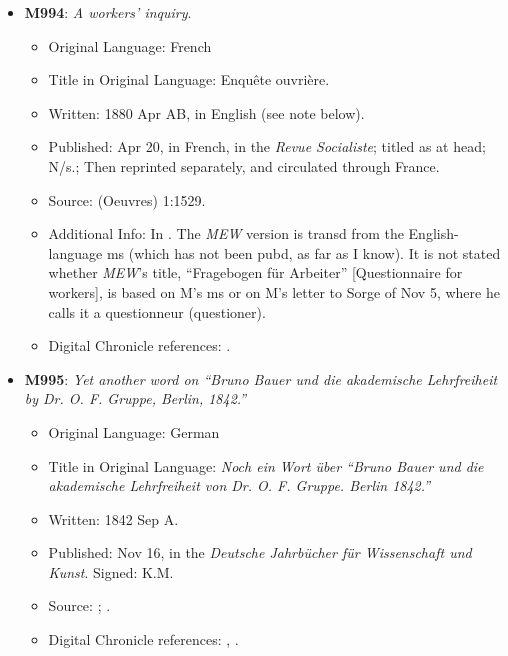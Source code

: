 \begin{itemize}
    \item \textbf{M994}: \textit{A workers' inquiry}.
    \begin{itemize}
        \item Original Language: French
        \item Title in Original Language: Enquête ouvrière.
        \item Written: 1880 Apr AB, in English (see note below).
        \item Published: Apr 20, in French, in the \textit{Revue Socialiste}; titled as at head; N/s.; Then reprinted separately, and circulated through France.
        \item Source:  (Oeuvres) 1:1529.
        \item Additional Info: In . The \textit{MEW} version is transd from the English-language ms (which has not been pubd, as far as I know). It is not stated whether \textit{MEW}'s title, ``Fragebogen für Arbeiter'' [Questionnaire for workers], is based on M's ms or on M's letter to Sorge of Nov 5, where he calls it a questionneur (questioner).
        \item Digital Chronicle references: .
    \end{itemize}

    \item \textbf{M995}: \textit{Yet another word on ``Bruno Bauer und die akademische Lehrfreiheit by Dr. O. F. Gruppe, Berlin, 1842.''}
    \begin{itemize}
        \item Original Language: German
        \item Title in Original Language: \textit{Noch ein Wort über ``Bruno Bauer und die akademische Lehrfreiheit von Dr. O. F. Gruppe. Berlin 1842.''}
        \item Written: 1842 Sep A.
        \item Published: Nov 16, in the \textit{Deutsche Jahrbücher für Wissenschaft und Kunst}. Signed: K.M.
        \item Source: ; .
        \item Digital Chronicle references: , .
    \end{itemize}

\end{itemize}

